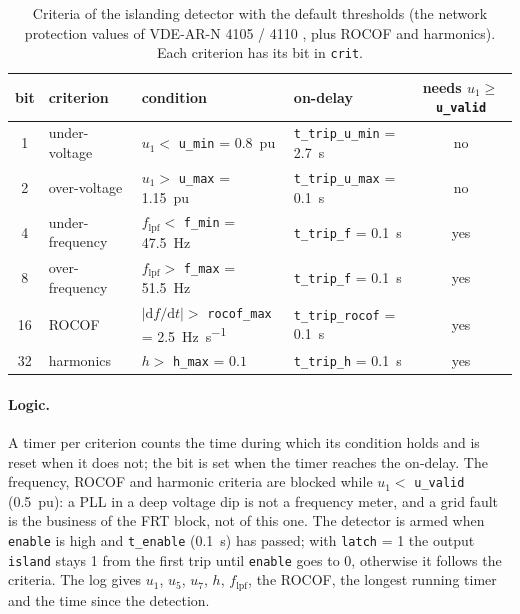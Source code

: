 \documentclass[11pt,a4paper]{scrartcl}
\newcommand{\ped}[1]{_{\mathrm{#1}}}
\newcommand{\code}[1]{\texttt{#1}}
\begin{document}
\begin{onehalfspace}
\begin{table}[H]
	\centering
	\footnotesize
	\caption{Criteria of the islanding detector with the default thresholds (the network protection values of VDE-AR-N 4105 / 4110 \cite{vde4105,vde4110}, plus ROCOF and harmonics). Each criterion has its bit in \code{crit}.}
	\label{tab:island}
	\begin{tabular}{@{} c l l l c @{}}
		\toprule
		\textbf{bit} & \textbf{criterion} & \textbf{condition} & \textbf{on-delay} & \textbf{needs $u_1 \ge$ \code{u\_valid}} \\
		\midrule
		1 & under-voltage & $u_1 <$ \code{u\_min} = \SI{0.8}{pu} & \code{t\_trip\_u\_min} = \SI{2.7}{\second} & no \\
		2 & over-voltage & $u_1 >$ \code{u\_max} = \SI{1.15}{pu} & \code{t\_trip\_u\_max} = \SI{0.1}{\second} & no \\
		4 & under-frequency & $f\ped{lpf} <$ \code{f\_min} = \SI{47.5}{\hertz} & \code{t\_trip\_f} = \SI{0.1}{\second} & yes \\
		8 & over-frequency & $f\ped{lpf} >$ \code{f\_max} = \SI{51.5}{\hertz} & \code{t\_trip\_f} = \SI{0.1}{\second} & yes \\
		16 & ROCOF & $|\mathrm{d}f/\mathrm{d}t| >$ \code{rocof\_max} = \SI{2.5}{\hertz\per\second} & \code{t\_trip\_rocof} = \SI{0.1}{\second} & yes \\
		32 & harmonics & $h >$ \code{h\_max} = $0.1$ & \code{t\_trip\_h} = \SI{0.1}{\second} & yes \\
		\bottomrule
	\end{tabular}
\end{table}

\paragraph{Logic.} A timer per criterion counts the time during which its condition holds and is reset when it does not; the bit is set when the timer reaches the on-delay. The frequency, ROCOF and harmonic criteria are blocked while $u_1 <$ \code{u\_valid} (\SI{0.5}{pu}): a PLL in a deep voltage dip is not a frequency meter, and a grid fault is the business of the FRT block, not of this one. The detector is armed when \code{enable} is high and \code{t\_enable} (\SI{0.1}{\second}) has passed; with \code{latch} = 1 the output \code{island} stays 1 from the first trip until \code{enable} goes to 0, otherwise it follows the criteria. The log gives $u_1$, $u_5$, $u_7$, $h$, $f\ped{lpf}$, the ROCOF, the longest running timer and the time since the detection.


\end{onehalfspace}
\end{document}
